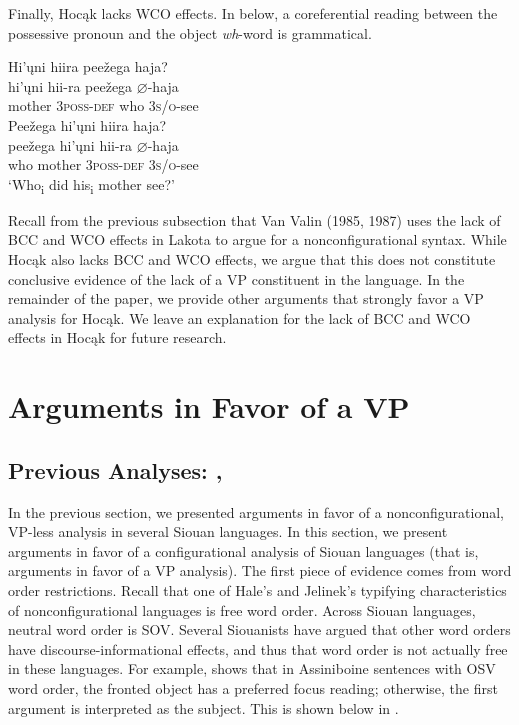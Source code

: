 \documentclass[output=paper]{LSP/langsci}
\begin{document}
Finally, Hocąk lacks WCO effects. In  below, a coreferential reading between the possessive pronoun and the object \textit{wh}-word is grammatical.

\begin{exe}
\ex
\begin{xlist}
\ex	
\glll Hi'\k{u}ni		hiira					pee\v{z}ega		haja? \\
hi'\k{u}ni		hii-ra 			pee\v{z}ega		$\varnothing$-haja \\
	mother		3\textsc{poss-def}		who	\textsc{3s/o}-see \\
\ex 
\glll Pee\v{z}ega 	hi'\k{u}ni 		hiira		haja?\\
pee\v{z}ega 	hi'\k{u}ni 		hii-ra 		$\varnothing$-haja \\
	who 	mother 	3\textsc{poss-def} 	\textsc{3s/o}-see \\
\trans `Who\textsubscript{i} did his\textsubscript{i} mother see?'
\end{xlist}
\end{exe}

Recall from the previous subsection that Van Valin (1985, 1987) uses the lack of BCC and WCO effects in Lakota to argue for a nonconfigurational syntax. While Hocąk also lacks BCC and WCO effects, we argue that this does not constitute conclusive evidence of the lack of a VP constituent in the language. In the remainder of the paper, we provide other arguments that strongly favor a VP analysis for Hocąk. We leave an explanation for the lack of BCC and WCO effects in Hocąk for future research.

\section{Arguments in Favor of a VP}

\subsection{Previous Analyses: \citet{Boyle2007}, \citet{Graczyk1991} \citet{West2003}}

In the previous section, we presented arguments in favor of a nonconfigurational, VP-less analysis in several Siouan languages.  In this section, we present arguments in favor of a configurational analysis of Siouan languages (that is, arguments in favor of a VP analysis).  The first piece of evidence comes from word order restrictions. Recall that one of Hale's  and Jelinek's  typifying characteristics of nonconfigurational languages is free word order.  Across Siouan languages, neutral word order is SOV.  Several Siouanists have argued that other word orders have discourse-informational effects, and thus that word order is not actually free in these languages. For example, \citet{West2003} shows that in Assiniboine sentences with OSV word order, the fronted object has a preferred focus reading; otherwise, the first argument is interpreted as the subject. This is shown below in . 
\end{document}

